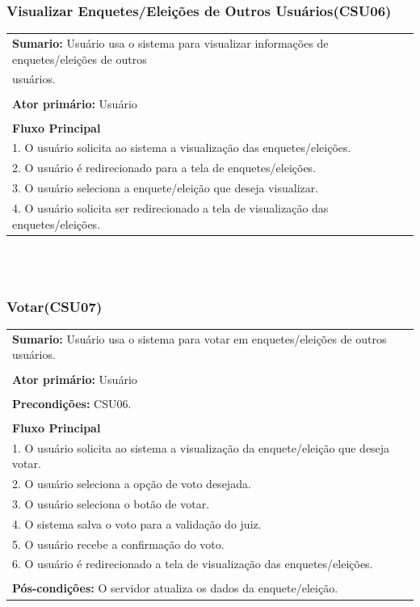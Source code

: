 \documentclass[a4paper,12pt]{article}
\begin{document}
\begin{center}
	{\subsubsection*{Visualizar Enquetes/Eleições de Outros Usuários(CSU06)}}
\end{center}
\markright{}
\begin{tabular}{|l|}\hline
	{\textbf{Sumario:}} Usuário usa o sistema para visualizar informações de enquetes/eleições de outros \hfill \\ usuários. \\\\
	{\textbf{Ator primário:}} Usuário \\\\
	{\textbf{Fluxo Principal}}\\
	1. O usuário solicita ao sistema a visualização das enquetes/eleições.\\
	2. O usuário é redirecionado para a tela de enquetes/eleições. \\
	3. O usuário seleciona a enquete/eleição que deseja visualizar. \\
	4. O usuário solicita ser redirecionado a tela de visualização das enquetes/eleições.\\
	\hline
\end{tabular}
\\\\
\begin{center}
	{\subsubsection*{Votar(CSU07)}}
\end{center}
\markright{}
\begin{tabular}{|l|}\hline
	{\textbf{Sumario:}} Usuário usa o sistema para votar em enquetes/eleições de outros usuários.\ \ \ \ \ \ \ \ \ \ \ \ \ \\\\
	{\textbf{Ator primário:}} Usuário \\\\
	{\textbf{Precondições:}} CSU06.\\\\
	{\textbf{Fluxo Principal}}\\
	1. O usuário solicita ao sistema a visualização da enquete/eleição que deseja votar.\\
	2. O usuário seleciona a opção de voto desejada.\\
	3. O usuário seleciona o botão de votar.\\
	4. O sistema salva o voto para a validação do juiz.\\
	5. O usuário recebe a confirmação do voto.\\
	6. O usuário é redirecionado a tela de visualização das enquetes/eleições.\\\\
	{\textbf{Pós-condições:}} O servidor atualiza os dados da enquete/eleição.\\
	\hline
\end{tabular}
\end{document}
